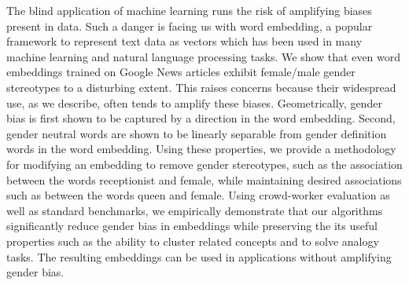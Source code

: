 The blind application of machine learning runs the risk of amplifying biases present in data. Such a danger is facing us with word embedding, a popular framework to represent text data as vectors which has been used in many machine learning and natural language processing tasks. We show that even word embeddings trained on Google News articles exhibit female/male gender stereotypes to a disturbing extent. This raises concerns because their widespread use, as we describe, often tends to amplify these biases. Geometrically, gender bias is first shown to be captured by a direction in the word embedding. Second, gender neutral words are shown to be linearly separable from gender definition words in the word embedding. Using these properties, we provide a methodology for modifying an embedding to remove gender stereotypes, such as the association between the words receptionist and female, while maintaining desired associations such as between the words queen and female. Using crowd-worker evaluation as well as standard benchmarks, we empirically demonstrate that our algorithms significantly reduce gender bias in embeddings while preserving the its useful properties such as the ability to cluster related concepts and to solve analogy tasks. The resulting embeddings can be used in applications without amplifying gender bias.

